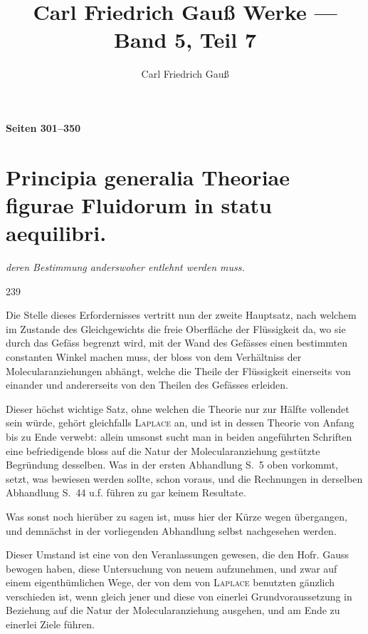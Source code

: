 \documentclass[12pt,a4paper]{article}
\title{Carl Friedrich Gauß Werke --- Band 5, Teil 7}
\author{Carl Friedrich Gauß}
\date{}
\begin{document}
\maketitle
\thispagestyle{fancy}

\begin{center}
    \Large\textbf{Seiten 301--350}
\end{center}

\vspace{1em}

\section*{Principia generalia Theoriae figurae Fluidorum in statu aequilibri.}


\textit{deren Bestimmung anderswoher entlehnt werden muss.}

\bigskip

\begin{center}
    239
\end{center}


Die Stelle dieses Erfordernisses vertritt nun der zweite Hauptsatz, nach welchem im Zustande des Gleichgewichts die freie Oberfläche der Flüssigkeit da, wo sie durch das Gefäss begrenzt wird, mit der Wand des Gefässes einen bestimmten constanten Winkel machen muss,
der bloss von dem Verhältniss der Molecularanziehungen abhängt, welche die Theile der Flüssigkeit einerseits von einander und andererseits von den Theilen des Gefässes erleiden.

Dieser höchst wichtige Satz, ohne welchen die Theorie nur zur Hälfte vollendet sein würde, gehört gleichfalls \textsc{Laplace} an, und ist in dessen Theorie von Anfang bis zu Ende verwebt: allein umsonst sucht man in beiden angeführten Schriften eine befriedigende bloss auf die Natur der Molecularanziehung gestützte Begründung desselben. Was in der ersten Abhandlung S.~5 oben vorkommt, setzt, was bewiesen werden sollte, schon voraus, und die Rechnungen in derselben Abhandlung S.~44 u.f. führen zu gar keinem Resultate.

Was sonst noch hierüber zu sagen ist, muss hier der Kürze wegen übergangen, und demnächst in der vorliegenden Abhandlung selbst nachgesehen werden.

Dieser Umstand ist eine von den Veranlassungen gewesen, die den Hofr. Gauss bewogen haben, diese Untersuchung von neuem aufzunehmen, und zwar auf einem eigenthümlichen Wege, der von dem von \textsc{Laplace} benutzten gänzlich verschieden ist, wenn gleich jener und diese von einerlei Grundvoraussetzung in Beziehung auf die Natur der Molecularanziehung ausgehen, und am Ende zu einerlei Ziele führen.
\end{document}
